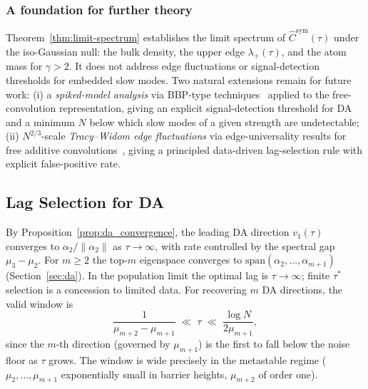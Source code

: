 \documentclass{article}
\begin{document}
\subsubsection{A foundation for further theory}
\label{app:foundation_for_further_theory}

Theorem~\ref{thm:limit-spectrum} establishes the limit spectrum of $\hat C^{\mathrm{sym}}(\tau)$ under the iso-Gaussian null: the bulk density, the upper edge $\lambda_+(\tau)$, and the atom mass for $\gamma > 2$. It does not address edge fluctuations or signal-detection thresholds for embedded slow modes. Two natural extensions remain for future work: (i) a \emph{spiked-model analysis} via BBP-type techniques~\cite{baik2005phase, benaych2011eigenvalues} applied to the free-convolution representation, giving an explicit signal-detection threshold for DA and a minimum $N$ below which slow modes of a given strength are undetectable; (ii) $N^{2/3}$-scale \emph{Tracy--Widom edge fluctuations} via edge-universality results for free additive convolutions~\cite{bao2016, lee2016}, giving a principled data-driven lag-selection rule with explicit false-positive rate.



\subsection{Lag Selection for DA}\label{app:lag_selection}

By Proposition~\ref{prop:da_convergence}, the leading DA direction
$v_1(\tau)$ converges to $\alpha_2/\|\alpha_2\|$ as $\tau \to \infty$,
with rate controlled by the spectral gap $\mu_3 - \mu_2$. For $m \geq 2$
the top-$m$ eigenspace converges to $\mathrm{span}(\alpha_2, \ldots, \alpha_{m+1})$
(Section~\ref{sec:da}). In the population limit the optimal lag is
$\tau \to \infty$; finite $\tau^*$ selection is a concession to limited data.
For recovering $m$ DA directions, the valid window is
\[
\frac{1}{\mu_{m+2} - \mu_{m+1}} \;\ll\; \tau \;\ll\; \frac{\log N}{2\mu_{m+1}},
\]
since the $m$-th direction (governed by $\mu_{m+1}$) is the first to fall below the noise floor as $\tau$ grows. The window is wide precisely in the metastable regime ($\mu_2, \ldots, \mu_{m+1}$ exponentially small in barrier heights, $\mu_{m+2}$ of order one).
\end{document}
